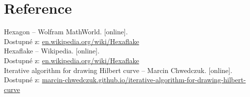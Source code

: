 \documentclass[12pt]{scrartcl}
\begin{document}
\section{Reference}

Hexagon – Wolfram MathWorld. [online].\\ Dostupné z: \href{http://mathworld.wolfram.com/Hexagon.html}{en.wikipedia.org/wiki/Hexaflake}
\\
Hexaflake – Wikipedia. [online].\\ Dostupné z: \href{https://en.wikipedia.org/wiki/Hexaflake}{en.wikipedia.org/wiki/Hexaflake}
\\
Iterative algorithm for drawing Hilbert curve – Marcin Chwedczuk. [online].\\ Dostupné z: \href{https://marcin-chwedczuk.github.io/iterative-algorithm-for-drawing-hilbert-curve}{marcin-chwedczuk.github.io/iterative-algorithm-for-drawing-hilbert-curve}
\end{document}
